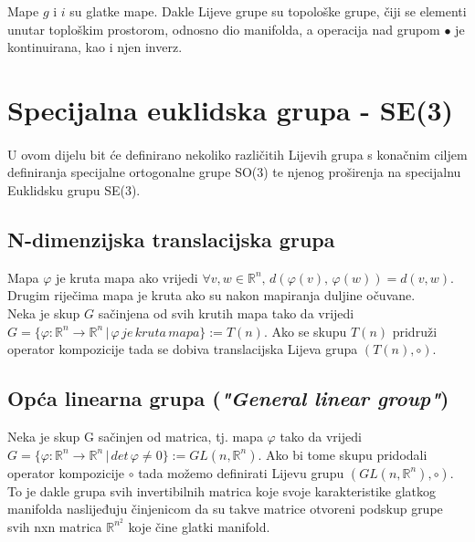 \documentclass[times, utf8, diplomski, numeric]{fer}
\begin{document}
	Mape $g$ i $i$ su glatke mape. Dakle Lijeve grupe su topološke grupe, čiji se elementi unutar toploškim prostorom, odnosno dio manifolda, a operacija nad grupom $\bullet$ je kontinuirana, kao i njen inverz.

	\newpage
	\clearpage
	
\section{Specijalna euklidska grupa - SE(3)}

	\paragraph{}U ovom dijelu bit će definirano nekoliko različitih Lijevih grupa s konačnim ciljem definiranja specijalne ortogonalne grupe SO(3) te njenog proširenja na specijalnu Euklidsku grupu SE(3). 	
	
	\subsection{N-dimenzijska translacijska grupa} Mapa $\varphi$ je kruta mapa ako vrijedi 
	$\forall v, w \in \mathbb{R}^n, \, d(\varphi(v), \, \varphi(w)) = d(v, w)$. Drugim riječima mapa je kruta ako su nakon mapiranja duljine očuvane. \\
	Neka je skup $G$ sačinjena od svih krutih mapa tako da vrijedi $G = \{ \varphi: \mathbb{R}^n \rightarrow \mathbb{R}^n \, | \, \varphi\, je\, kruta\, mapa\} := T(n)$. Ako se skupu $T(n)$ pridruži operator kompozicije tada se dobiva translacijska Lijeva grupa $(T(n), \circ)$.
	
	\subsection{Opća linearna grupa (\textit{"General linear group"})} Neka je skup G sačinjen od matrica, tj. mapa $\varphi$ tako da vrijedi $G = \{ \varphi: \mathbb{R}^n \rightarrow \mathbb{R}^n \,|\, det \, \varphi \neq 0 \}:=GL(n, \mathbb{R}^n)$. Ako bi tome skupu pridodali operator kompozicije $\circ$ tada možemo definirati Lijevu grupu $(GL(n, \mathbb{R}^n), \circ)$. To je dakle grupa svih invertibilnih matrica koje svoje karakteristike glatkog manifolda naslijeđuju činjenicom da su takve matrice otvoreni podskup grupe svih nxn matrica $\mathbb{R}^{n^2}$ koje čine glatki manifold.
	
\end{document}
